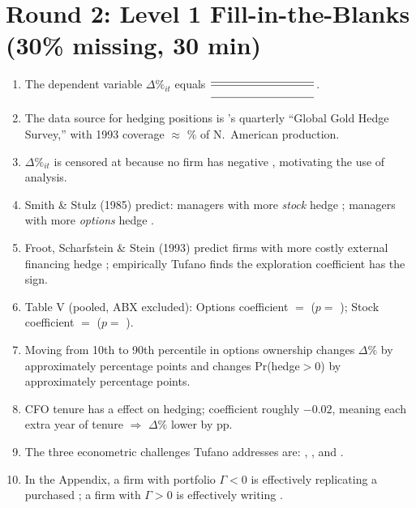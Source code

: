 \documentclass[11pt]{article}
\newcommand{\dP}{\Delta\%}
\newcommand{\blank}[1]{\underline{\hspace{#1}}}
\begin{document}
\section*{Round 2: Level 1 Fill-in-the-Blanks (30\% missing, 30 min)}
\begin{enumerate}
\item The dependent variable $\dP_{it}$ equals $\dfrac{\blank{3.2cm}}{\blank{3.2cm}}$.
\item The data source for hedging positions is \blank{3cm}'s quarterly ``Global Gold Hedge Survey,'' with 1993 coverage $\approx$ \blank{1cm}\% of N.\ American production.
\item $\dP_{it}$ is censored at \blank{0.8cm} because no firm has negative \blank{3cm}, motivating the use of \blank{2cm} analysis.
\item Smith \& Stulz (1985) predict: managers with more \emph{stock} hedge \blank{1.5cm}; managers with more \emph{options} hedge \blank{1.5cm}.
\item Froot, Scharfstein \& Stein (1993) predict firms with more costly external financing hedge \blank{1.5cm}; empirically Tufano finds the exploration coefficient has the \blank{1.5cm} sign.
\item Table V (pooled, ABX excluded): Options coefficient $=$ \blank{1cm} ($p = $ \blank{0.8cm}); Stock coefficient $=$ \blank{1cm} ($p = $ \blank{0.8cm}).
\item Moving from 10th to 90th percentile in options ownership changes $\dP$ by approximately \blank{0.8cm} percentage points and changes Pr(hedge${>}0$) by approximately \blank{0.8cm} percentage points.
\item CFO tenure has a \blank{0.8cm} effect on hedging; coefficient roughly $-0.02$, meaning each extra year of tenure $\Rightarrow$ $\dP$ lower by \blank{0.8cm} pp.
\item The three econometric challenges Tufano addresses are: \blank{3cm}, \blank{3cm}, and \blank{3cm}.
\item In the Appendix, a firm with portfolio $\Gamma < 0$ is effectively replicating a purchased \blank{1cm}; a firm with $\Gamma > 0$ is effectively writing \blank{1cm}.
\end{enumerate}
\end{document}
